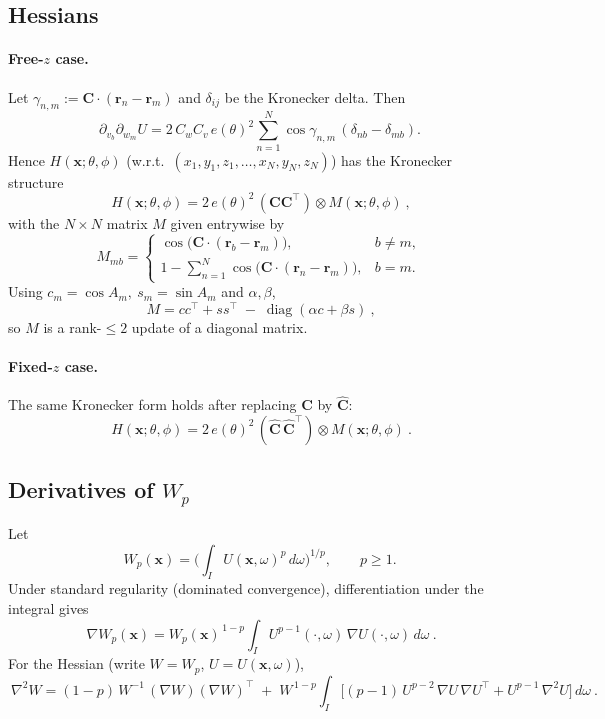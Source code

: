 \documentclass[11pt,letterpaper]{article}
\theoremstyle{definition}
\theoremstyle{plain}
\begin{document}
\subsection*{Hessians}

\paragraph{Free-$z$ case.}
Let $\gamma_{n,m}:=\mathbf C\!\cdot(\mathbf r_n-\mathbf r_m)$ and $\delta_{ij}$ be the Kronecker delta. Then
\[
\partial_{v_b}\partial_{w_m}U
=2\,C_w C_v\,e(\theta)^2 \sum_{n=1}^N \cos\gamma_{n,m}\,(\delta_{nb}-\delta_{mb}).
\]
Hence $H(\mathbf x;\theta,\phi)$ (w.r.t.\ $(x_1,y_1,z_1,\dots,x_N,y_N,z_N)$) has the Kronecker structure
\[
\boxed{\ H(\mathbf x;\theta,\phi)=2\,e(\theta)^2\,(\mathbf C\mathbf C^\top)\otimes M(\mathbf x;\theta,\phi)\ },
\]
with the $N\times N$ matrix $M$ given entrywise by
\[
M_{mb}=
\begin{cases}
\cos\!\big(\mathbf C\!\cdot(\mathbf r_b-\mathbf r_m)\big), & b\neq m,\\[2mm]
1-\sum_{n=1}^N \cos\!\big(\mathbf C\!\cdot(\mathbf r_n-\mathbf r_m)\big), & b=m.
\end{cases}
\]
Using $c_m=\cos A_m,\ s_m=\sin A_m$ and $\alpha,\beta$,
\[
\boxed{\ M = c c^\top + s s^\top\;-\;\operatorname{diag}(\alpha c+\beta s)\ },
\]
so $M$ is a rank-$\le2$ update of a diagonal matrix.

\paragraph{Fixed-$z$ case.}
The same Kronecker form holds after replacing $\mathbf C$ by $\widehat{\mathbf C}$:
\[
\boxed{\ H(\mathbf x;\theta,\phi)=2\,e(\theta)^2\,(\widehat{\mathbf C}\,\widehat{\mathbf C}^{\!\top})\otimes M(\mathbf x;\theta,\phi)\ }.
\]

\subsection*{Derivatives of $W_p$}
Let
\[
W_p(\mathbf x)=\Big(\!\int_I U(\mathbf x,\omega)^p\,d\omega\Big)^{1/p},\qquad p\ge1.
\]
Under standard regularity (dominated convergence), differentiation under the integral gives
\[
\boxed{\ \nabla W_p(\mathbf x)
= W_p(\mathbf x)^{\,1-p}\!\int_I U^{p-1}(\cdot,\omega)\,\nabla U(\cdot,\omega)\,d\omega\ }.
\]
For the Hessian (write $W=W_p$, $U=U(\mathbf x,\omega)$),
\[
\boxed{\ 
\nabla^2 W
=(1-p)\,W^{-1}\,(\nabla W)(\nabla W)^\top
\;+\; W^{\,1-p}\!\int_I\!\Big[(p-1)\,U^{p-2}\,\nabla U\,\nabla U^\top
+ U^{p-1}\,\nabla^2 U\Big]\,d\omega\ }.
\]
\end{document}
